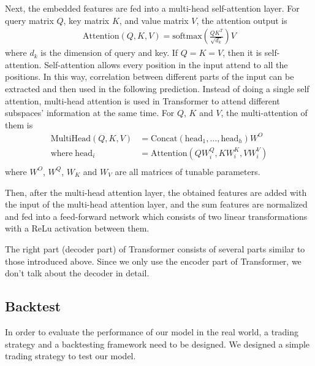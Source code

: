 \documentclass{article}
\begin{document}
\hspace{16}Next, the embedded features are fed into a multi-head self-attention layer. For query matrix $Q$, key matrix $K$, and value matrix $V$, the attention output is
\begin{equation*}
    \begin{aligned}
    \textrm{Attention}(Q, K, V) = \textrm{softmax}(\frac{QK^T}{\sqrt{d_k}})V
    \end{aligned}
\end{equation*}
where $d_k$ is the dimension of query and key. If $Q = K = V$, then it is self-attention. Self-attention allows every position in the input attend to all the positions. In this way, correlation between different parts of the input can be extracted and then used in the following prediction. Instead of doing a single self attention, multi-head attention is used in Transformer to attend different subspaces' information at the same time. For $Q$, $K$ and $V$, the multi-attention of them is
\begin{equation*}
    \begin{aligned}
    \textrm{MultiHead}(Q, K, V) &= \textrm{Concat}(\textrm{head}_1, \dots, \textrm{head}_h)W^O \\
    \textrm{where}\; \textrm{head}_i &= \textrm{Attention}(QW_i^Q, KW_i^K, VW_i^V)\\
    \end{aligned}
\end{equation*}
where $W^O$, $W^Q$, $W_K$ and $W_V$ are all matrices of tunable parameters.

\hspace{16}Then, after the multi-head attention layer, the obtained features are added with the input of the multi-head attention layer, and the sum features are normalized and fed into a feed-forward network which consists of two linear transformations with a ReLu activation between them.

\hspace{16}The right part (decoder part) of Transformer consists of several parts similar to those introduced above. Since we only use the encoder part of Transformer, we don't talk about the decoder in detail.

\subsection{Backtest}
\label{sec:backtest}
\hspace{16}In order to evaluate the performance of our model in the real world, a trading strategy and a backtesting framework need to be designed. We designed a simple trading strategy to test our model.
\end{document}
